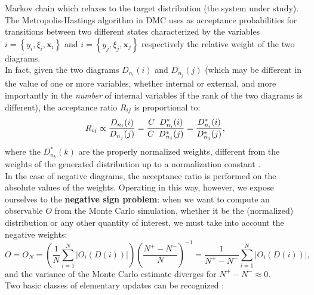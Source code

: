 Markov chain which relaxes to the target distribution (the system under study). The Metropolis-Hastings algorithm in DMC uses as acceptance probabilities for transitions 
between two different states characterized by the variables $i=\left\{y_i,\xi_i,\mathbf{x}_i\right\}$ and $i=\left\{y_j,\xi_j,\mathbf{x}_j\right\}$ respectively the relative weight of the two 
diagrams.\\
In fact, given the two diagrams $D_{n_i}(i)$ and $D_{n_j}(j)$ (which may be different in the value of one or more variables, whether internal or external, and more importantly in the \textit{number} 
of internal variables if the rank of the two diagrams is different), the acceptance ratio $R_{ij}$ is proportional to:
\begin{equation}
    R_{ij}\propto \frac{D_{n_i}(i)}{D_{n_j}(j)}= \frac{C\hspace{0.2cm}D_{n_i}^*(i)}{C\hspace{0.2cm}D_{n_j}^*(j)}=\frac{D_{n_i}^*(i)}{D_{n_j}^*(j)},
\end{equation}
where the $D_{n_k}^*(k)$ are the properly normalized weights, different from the weights of the generated distribution up to a normalization constant \cite{HahnThomas2017DqMC}.\\
In the case of negative diagrams, the acceptance ratio is performed on the absolute values of the weights. Operating in this way, however, we expose ourselves 
to the \textbf{negative sign problem}: when we want to compute an observable $O$ from the Monte Carlo simulation, whether it be the (normalized) distribution 
or any other quantity of interest, we must take into account the negative weights:
\begin{equation}
    O = O_N =\left(\frac{1}{N}\sum_{i=1}^N |O_i(D(i))|\right)\left(\frac{N^+-N^-}{N}\right)^{-1}=\frac{1}{N^+-N^-}\sum_{i=1}^N |O_i(D(i))|,
\end{equation}
and the variance of the Monte Carlo estimate diverges for $N^+ - N^-\approx 0$.\\
Two basic classes of elementary updates can be recognized \cite{van2010diagrammatic}\cite{mishchenko2000diagrammatic}:
